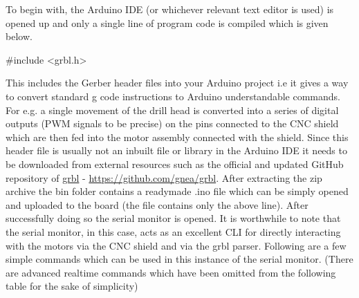 To begin with, the Arduino IDE (or whichever relevant text editor is used) is opened up and only a single line of program code is compiled which is given below.

 {\selectfont \#include <grbl.h>}

This includes the Gerber header files into your Arduino project i.e it gives a way to convert standard g code instructions to Arduino understandable commands. For e.g. a single movement of the drill head is converted into a series of digital outputs (PWM signals to be precise) on the pins connected to the CNC shield which are then fed into the motor assembly connected with the shield. Since this header file is usually not an inbuilt file or library in the Arduino IDE it needs to be downloaded from external resources such as the official and updated GitHub repository of \href{https://github.com/gnea/grbl}{grbl} - \url{https://github.com/gnea/grbl}. After extracting the zip archive the bin folder contains a readymade .ino file which can be simply opened and uploaded to the board (the file contains only the above line). After successfully doing so the serial monitor is opened. It is worthwhile to note that the serial monitor, in this case, acts as an excellent CLI for directly interacting with the motors via the CNC shield and via the grbl parser. Following are a few simple commands which can be used in this instance of the serial monitor. (There are advanced realtime commands which have been omitted from the following table for the sake of simplicity) \par


